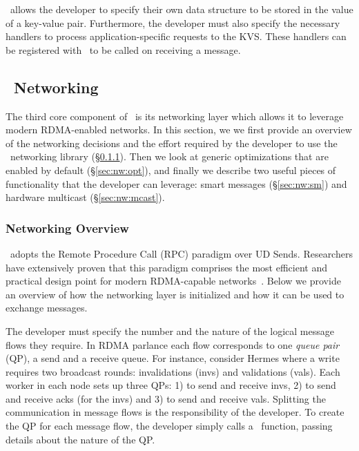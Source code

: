 \odlib~allows the developer to specify their own data structure to be stored in the value of a key-value pair. 
Furthermore, the developer must also specify 
the necessary handlers to process application-specific requests to the KVS. These handlers can be registered with \odlib~to be called on receiving a message.


\subsection{\odlib~Networking} \label{sec:nw}
The third core component of \odlib\ is its networking layer which  allows it to leverage modern RDMA-enabled networks. 
In this section, we we first provide an overview of the networking decisions and the effort required by the developer to use the \odlib~networking library (\S\ref{sec:nw:ov}). Then we look at generic optimizations that are enabled by default (\S\ref{sec:nw:opt}), and finally we describe two useful pieces of functionality that the developer can leverage: smart messages (\S\ref{sec:nw:sm}) and hardware multicast (\S\ref{sec:nw:mcast}).

\subsubsection{Networking Overview} \label{sec:nw:ov}


\odlib\ adopts the Remote Procedure Call (RPC) paradigm over UD Sends. Researchers have extensively proven that this paradigm comprises the most efficient and practical design point for modern RDMA-capable networks~\cite{Kalia:2014, Kalia:2016, F-Kalia:2016, Kalia:2019}.
Below we provide an overview of how the networking layer is initialized and how it can be used to exchange messages.

The developer must specify the number and the nature of the logical message flows they require.
In RDMA parlance each flow corresponds to one \emph{queue pair} (QP), \ie a send and a receive queue. 
For instance, consider  Hermes  where a write requires two broadcast rounds: invalidations (invs) and validations (vals).
Each worker in each node sets up three QPs:  1) to send and receive invs, 2) to send and receive acks (for the invs) and 3) to send and receive vals.
Splitting the communication in message flows is the responsibility of the developer. To create the QP for each message flow, the developer simply calls a \odlib~function, passing details about the nature of the QP. %


